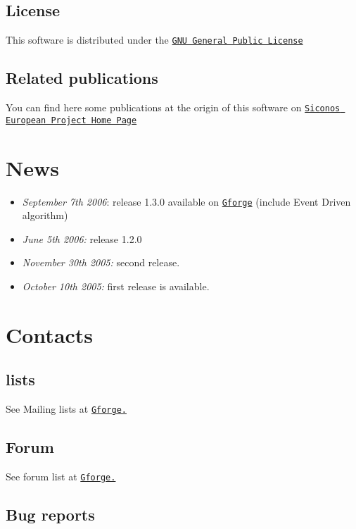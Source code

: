 \hypertarget{index_license}{}\subsection{License}\label{index_license}
This software is distributed under the \href{http://www.gnu.org/copyleft/gpl.html}{\tt GNU General Public License} \hypertarget{index_publi}{}\subsection{Related publications}\label{index_publi}
You can find here some publications at the origin of this software on \href{http://siconos.inrialpes.fr/}{\tt Siconos European Project Home Page} \hypertarget{index_news}{}\section{News}\label{index_news}
\begin{itemize}
\item {\em  September 7th 2006\/}: release 1.3.0 available on \href{http://gforge.inria.fr/projects/siconos}{\tt Gforge} (include Event Driven algorithm)\item {\em  June 5th 2006:\/} release 1.2.0\item {\em  November 30th 2005:\/} second release.\item {\em  October 10th 2005:\/} first release is available. \end{itemize}
\hypertarget{index_contacts}{}\section{Contacts}\label{index_contacts}
\hypertarget{index_Mailing}{}\subsection{lists}\label{index_Mailing}
See Mailing lists at \href{https://gforge.inria.fr/mail/?group_id=9}{\tt Gforge.} \hypertarget{index_forum}{}\subsection{Forum}\label{index_forum}
See forum list at \href{https://gforge.inria.fr/forum/?group_id=9}{\tt Gforge.} \hypertarget{index_bug}{}\subsection{Bug reports}\label{index_bug}
